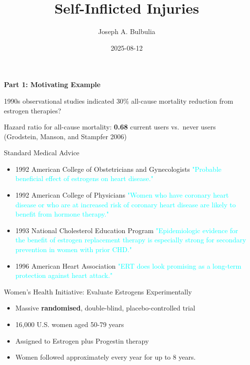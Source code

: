\documentclass[
  ignorenonframetext,
  aspectratio=169,
]{beamer}
\title{Self-Inflicted Injuries}
\author{Joseph A. Bulbulia}
\date{2025-08-12}
\begin{document}
\frame{\titlepage}


\begin{frame}{\textbf{Part 1: Motivating Example}}
\label{part-1-motivating-example}
\begin{block}{1990s observational studies indicated 30\% all-cause
mortality reduction from estrogen therapies?}
\label{s-observational-studies-indicated-30-all-cause-mortality-reduction-from-estrogen-therapies}
\begin{tcolorbox}[enhanced jigsaw, toprule=.15mm, leftrule=.75mm, bottomtitle=1mm, colbacktitle=quarto-callout-note-color!10!white, rightrule=.15mm, bottomrule=.15mm, left=2mm, breakable, coltitle=black, arc=.35mm, toptitle=1mm, title=\textcolor{quarto-callout-note-color}{\faInfo}\hspace{0.5em}{In the 1980s and 1990s estrogen treatments appeared to \textbf{benefit}
postmenopausal women}, colback=white, opacityback=0, titlerule=0mm, opacitybacktitle=0.6, colframe=quarto-callout-note-color-frame]

Hazard ratio for all-cause mortality: \textbf{0.68} current users
vs.~never users (Grodstein, Manson, and Stampfer 2006)

\end{tcolorbox}
\end{block}

\begin{block}{Standard Medical Advice}
\label{standard-medical-advice}
\begin{itemize}
\item
  1992 American College of Obstetricians and Gynecologists
  \textcolor{cyan}{"Probable beneficial effect of estrogens on heart disease."}
\item
  1992 American College of Physicians
  \textcolor{cyan}{"Women who have coronary heart disease or who are at increased risk of coronary heart disease are likely to benefit from hormone therapy."}
\item
  1993 National Cholesterol Education Program
  \textcolor{cyan}{"Epidemiologic evidence for the benefit of estrogen replacement therapy is especially strong for secondary prevention in women with prior CHD."}
\item
  1996 American Heart Association
  \textcolor{cyan}{"ERT does look promising as a long-term protection against heart attack."}
\end{itemize}
\end{block}

\begin{block}{Women's Health Initiative: Evaluate Estrogens
Experimentally}
\label{womens-health-initiative-evaluate-estrogens-experimentally}
\begin{itemize}
\item
  Massive \textbf{randomised}, double-blind, placebo-controlled trial
\item
  16,000 U.S. women aged 50-79 years
\item
  Assigned to Estrogen plus Progestin therapy
\item
  Women followed approximately every year for up to 8 years.
\end{itemize}
\end{block}


\end{frame}
\end{document}
